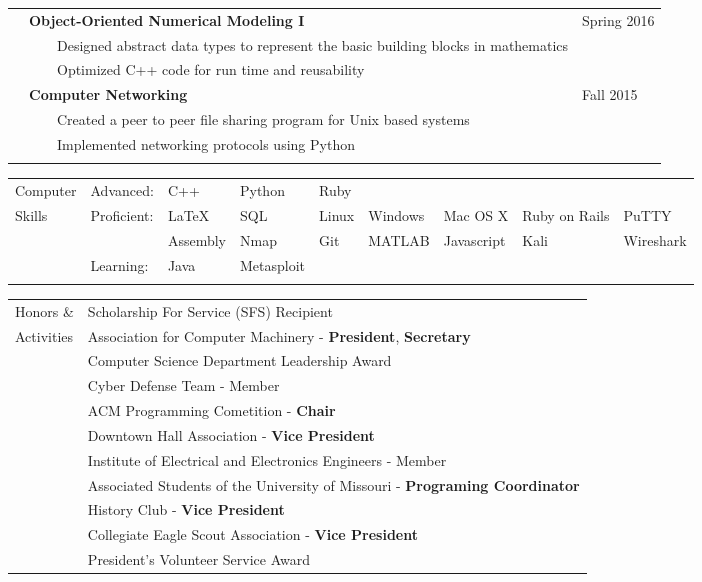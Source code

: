 \documentclass[10.5pt, arial]{article}
\newcommand{\tabitem}{~~\llap{\textbullet}~~}
\begin{document}
\begin{tabular}{p{1.5cm} p{13.2cm} l}
			& \textbf{Object-Oriented Numerical Modeling I} 					& Spring 2016 			\\
			& \tabitem Designed abstract data types to represent the basic building blocks in mathematics & \\
			& \tabitem Optimized C++ code for run time and reusability 		& 						\\

			& \textbf{Computer Networking} 										& Fall 2015 			\\
			& \tabitem Created a peer to peer file sharing program for Unix based systems 		& 		\\
			& \tabitem Implemented networking protocols using Python 						& 						\\
						\\
\end{tabular}

\begin{tabular}{p{1.5cm} l l l l l l l l}
Computer	& Advanced: 	& C++ 		& Python 	& Ruby		& 			& 			& 					\\
Skills		& Proficient:	& \LaTeX	 	& SQL 		& Linux 	& Windows 	& Mac OS X 	& Ruby on Rails	& 				PuTTY  	\\
			&			 	& Assembly 	& Nmap 		& Git 		& MATLAB	& Javascript& Kali			& Wireshark	\\
			& Learning:		& Java 		& Metasploit& 			& 			& 			& 					\\ \\
\end{tabular}

\begin{tabular}{p{1.5cm} l}
Honors \&	& Scholarship For Service (SFS) Recipient 																	\\
Activities	& Association for Computer Machinery - \textbf{President}, \textbf{Secretary}								\\
			& Computer Science Department Leadership Award 																\\
			& Cyber Defense Team - Member																				\\
			& ACM Programming Cometition - \textbf{Chair}																\\
			& Downtown Hall Association - \textbf{Vice President}														\\
			& Institute of Electrical and Electronics Engineers - Member												\\
			& Associated Students of the University of Missouri - \textbf{Programing Coordinator} 						\\
			& History Club - \textbf{Vice President} 																	\\
			& Collegiate Eagle Scout Association - \textbf{Vice President} 		 										\\
			& President's Volunteer Service Award																		\\
\end{tabular}
\end{document}

